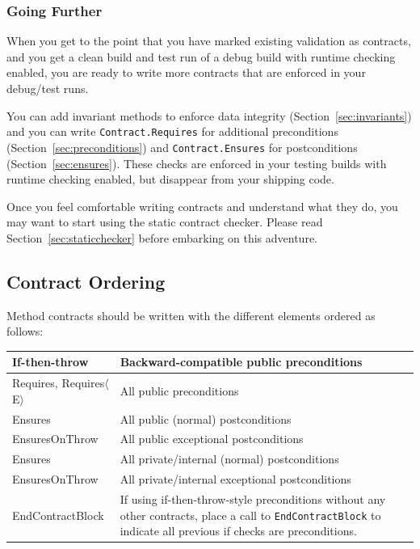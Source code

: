 \documentclass{article}
\newcommand{\code}[1]{\lstinline{#1}}
\newcommand{\requiresn}[1]{{Requires}$\langle$#1$\rangle$}
\begin{document}
\subsubsection{Going Further}
When you get to the point that you have marked existing validation as
contracts, and you get a clean build and test run of a debug build
with runtime checking enabled, you are ready to write more contracts
that are enforced in your debug/test runs. 

You can add invariant methods to enforce data
integrity (Section~\ref{sec:invariants}) and you can write
\code{Contract.Requires} for additional preconditions (Section~\ref{sec:preconditions}) and
\code{Contract.Ensures} for postconditions
(Section~\ref{sec:ensures}). These checks are enforced in your
testing builds with runtime checking enabled, but disappear from your shipping code.

Once you feel comfortable writing contracts and understand what they
do, you may want to start using the static contract checker. Please
read Section~\ref{sec:staticchecker} before embarking on this adventure.

\subsection{Contract Ordering}
Method contracts should be written with the different elements ordered
as follows:

\vspace*{5pt}
\begin{tabular}{|l|p{4in}|}
\hline
If-then-throw	& Backward-compatible public preconditions
\\
\hline
Requires, \requiresn{E} & All public preconditions
\\
\hline
Ensures & All public (normal) postconditions
\\
\hline
EnsuresOnThrow	& All public exceptional postconditions
\\
\hline
Ensures & All private/internal (normal) postconditions
\\
\hline
EnsuresOnThrow	& All private/internal exceptional postconditions
\\
\hline
EndContractBlock & If using if-then-throw-style preconditions without
any other contracts, place a call to \code{EndContractBlock} to
indicate all previous if checks are preconditions.
\\
\hline
\end{tabular}
\vspace*{5pt}
\end{document}
